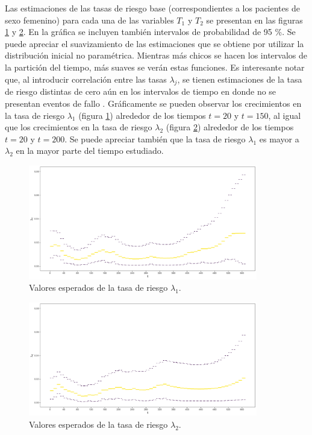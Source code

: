 \documentclass[11pt,a4paper]{article}
\begin{document}
\newpage

Las estimaciones de las tasas de riesgo base (correspondientes a los pacientes de sexo femenino) para cada una de las variables $T_1$ y $T_2$ se presentan en las figuras \ref{fig:haz_lambda1} y \ref{fig:haz_lambda2}. En la gráfica se incluyen también intervalos de probabilidad de 95 \%. Se puede apreciar el suavizamiento de las estimaciones que se obtiene por utilizar la distribución inicial no paramétrica. Mientras más chicos se hacen los intervalos de la partición del tiempo, más suaves se verán estas funciones. Es interesante notar que, al introducir correlación entre las tasas $\lambda_j$, se tienen estimaciones de la tasa de riesgo distintas de cero aún en los intervalos de tiempo en donde no se presentan eventos de fallo \citep{nieto}. Gráficamente se pueden observar los crecimientos en la tasa de riesgo $\lambda_1$ (figura \ref{fig:haz_lambda1}) alrededor de los tiempos $t = 20$ y $t = 150$, al igual que los crecimientos en la tasa de riesgo $\lambda_2$ (figura \ref{fig:haz_lambda2}) alrededor de los tiempos $t = 20$ y $t = 200$. Se puede apreciar también que la tasa de riesgo $\lambda_1$ es mayor a $\lambda_2$ en la mayor parte del tiempo estudiado.

\begin{figure}[!htb]
\centering\includegraphics[width=10cm]{hazard1.png}
\caption{Valores esperados de la tasa de riesgo $\lambda_1$.}
\label{fig:haz_lambda1}
\end{figure}

\begin{figure}[!htb]
\centering\includegraphics[width=10cm]{hazard2.png}
\caption{Valores esperados de la tasa de riesgo $\lambda_2$.}
\label{fig:haz_lambda2}
\end{figure}
\end{document}
